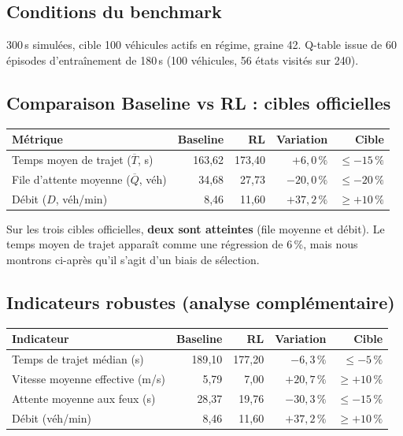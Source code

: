 \documentclass[a4paper,10pt]{article}
\begin{document}
\subsection{Conditions du benchmark}

300\,s simul\'{e}es, cible 100 v\'{e}hicules actifs en r\'{e}gime, graine 42.
Q-table issue de 60 \'{e}pisodes d'entra\^{i}nement de 180\,s
(100 v\'{e}hicules, 56 \'{e}tats visit\'{e}s sur 240).

\subsection{Comparaison Baseline vs RL : cibles officielles}

\begin{tabular}{lrrrr}
\toprule
\textbf{M\'{e}trique} & \textbf{Baseline} & \textbf{RL} & \textbf{Variation} & \textbf{Cible} \\
\midrule
Temps moyen de trajet ($\overline{T}$, s)
  & 163{,}62 & 173{,}40 & $+6{,}0\,\%$ & $\leq -15\,\%$ \\
File d'attente moyenne ($\overline{Q}$, v\'{e}h)
  &  34{,}68 &  27{,}73 & $-20{,}0\,\%$ & $\leq -20\,\%$ \\
D\'{e}bit ($D$, v\'{e}h/min)
  &   8{,}46 &  11{,}60 & $+37{,}2\,\%$ & $\geq +10\,\%$ \\
\bottomrule
\end{tabular}

Sur les trois cibles officielles, \textbf{deux sont atteintes} (file
moyenne et d\'{e}bit). Le temps moyen de trajet appara\^{i}t comme une
r\'{e}gression de 6\,\%, mais nous montrons ci-apr\`{e}s qu'il s'agit d'un
biais de s\'{e}lection.

\subsection{Indicateurs robustes (analyse compl\'{e}mentaire)}

\begin{tabular}{lrrrr}
\toprule
\textbf{Indicateur} & \textbf{Baseline} & \textbf{RL} & \textbf{Variation} & \textbf{Cible} \\
\midrule
Temps de trajet m\'{e}dian (s)            & 189{,}10 & 177{,}20 & $-6{,}3\,\%$  & $\leq -5\,\%$ \\
Vitesse moyenne effective (m/s)         &   5{,}79 &   7{,}00 & $+20{,}7\,\%$ & $\geq +10\,\%$ \\
Attente moyenne aux feux (s)            &  28{,}37 &  19{,}76 & $-30{,}3\,\%$ & $\leq -15\,\%$ \\
D\'{e}bit (v\'{e}h/min)                    &   8{,}46 &  11{,}60 & $+37{,}2\,\%$ & $\geq +10\,\%$ \\
\bottomrule
\end{tabular}
\end{document}

